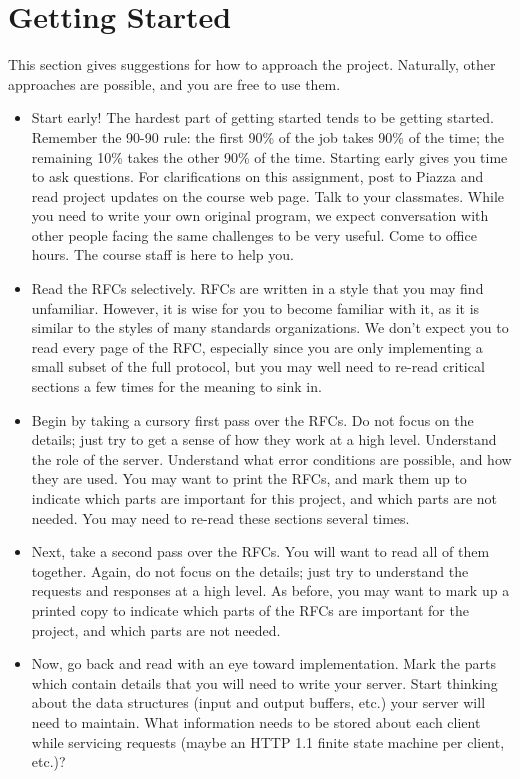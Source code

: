 \documentclass[12pt]{article}
\begin{document}
\section{Getting Started}

This section gives suggestions for how to approach the project. Naturally, other approaches are possible, and you are free to use them.
\begin{itemize}
\item Start early! The hardest part of getting started tends to be getting started. Remember the 90-90 rule: the first 90\% of the job takes 90\% of the time; the remaining 10\% takes the other 90\% of the time. Starting early gives you time to ask questions. For clarifications on this assignment, post to Piazza and read project updates on the course web page. Talk to your classmates. While you need to write your own original program, we expect conversation with other people facing the same challenges to be very useful. Come to office hours. The course staff is here to help you.
\item Read the RFCs selectively. RFCs are written in a style that you may find unfamiliar. However, it is wise for you to become familiar with it, as it is similar to the styles of many standards organizations. We don’t expect you to read every page of the RFC, especially since you are only implementing a small subset of the full protocol, but you may well need to re-read critical sections a few times for the meaning to sink in.
\item Begin by taking a cursory first pass over the RFCs. Do not focus on the details; just try to get a sense of how they work at a high level. Understand the role of the server. Understand what error conditions are possible, and how they are used. You may want to print the RFCs, and mark them up to indicate which parts are important for this project, and which parts are not needed. You may need to re-read these sections several times.
\item Next, take a second pass over the RFCs. You will want to read all of them together. Again, do not focus on the details; just try to understand the requests and responses at a high level. As before, you may want to mark up a printed copy to indicate which parts of the RFCs are important for the project, and which parts are not needed.
\item Now, go back and read with an eye toward implementation. Mark the parts which contain details that you will need to write your server. Start thinking about the data structures (input and output buffers, etc.) your server will need to maintain. What information needs to be stored about each client while servicing requests (maybe an HTTP 1.1 finite state machine per client, etc.)?

\end{itemize}
\end{document}
